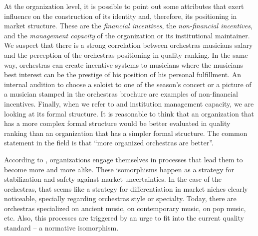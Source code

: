 \documentclass[a4paper, 12pt, openright, oneside, german, french, brazil, english]{abntex2}
\begin{document}
	At the organization level, it is possible to point out some attributes that exert influence on the construction of its identity and, therefore, its positioning in market structure. These are the \textit{financial incentives}, the \textit{non-financial incentives}, and  the \textit{management capacity} of the organization or its institutional maintainer. We suspect that there is a strong correlation between orchestras musicians salary and the perception of the orchestras positioning in quality ranking. In the same way, orchestras can create incentive systems to musicians where the musicians best interest can be the prestige of his position of his personal fulfillment. An internal audition to choose a soloist to one of the season's concert or a picture of a musician stamped in the orchestras brochure are examples of non-financial incentives. Finally, when we refer to and institution management capacity, we are looking at its formal structure. It is reasonable to think that an organization that has a more complex formal structure would be better evaluated in quality ranking than an organization that has a simpler formal structure. The common statement in the field is that ``more organized orchestras are better''.
	
	
	According to , organizations engage themselves in processes that lead them to become more and more alike. These isomorphisms happen as a strategy for stabilization and safety against market uncertainties. In the case of the orchestras, that seems like a strategy for differentiation in market niches clearly noticeable, specially regarding orchestras style or specialty. Today, there are orchestras specialized on ancient music, on contemporary music, on pop music, etc. Also, this processes are triggered by an urge to fit into the current quality standard -- a normative isomorphism.
	
	
\end{document}
